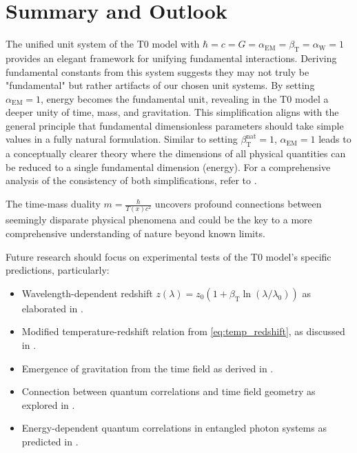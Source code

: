 \documentclass[12pt,a4paper]{article}
\newcommand{\Tfield}{T(x)}
\newcommand{\betaT}{\beta_{\text{T}}}
\newcommand{\alphaEM}{\alpha_{\text{EM}}}
\newcommand{\alphaW}{\alpha_{\text{W}}}
\begin{document}
	\section{Summary and Outlook}
	\label{sec:summary}
	
	The unified unit system of the T0 model with \(\hbar = c = G = \alphaEM = \betaT = \alphaW = 1\) provides an elegant framework for unifying fundamental interactions. Deriving fundamental constants from this system suggests they may not truly be "fundamental" but rather artifacts of our chosen unit systems. By setting \(\alphaEM = 1\), energy becomes the fundamental unit, revealing in the T0 model a deeper unity of time, mass, and gravitation. This simplification aligns with the general principle that fundamental dimensionless parameters should take simple values in a fully natural formulation. Similar to setting \(\betaT^{\text{nat}} = 1\), \(\alphaEM = 1\) leads to a conceptually clearer theory where the dimensions of all physical quantities can be reduced to a single fundamental dimension (energy). For a comprehensive analysis of the consistency of both simplifications, refer to \cite{pascher_alphabeta_2025}.
	
	The time-mass duality \(m = \frac{\hbar}{\Tfield c^2}\) uncovers profound connections between seemingly disparate physical phenomena and could be the key to a more comprehensive understanding of nature beyond known limits.
	
	Future research should focus on experimental tests of the T0 model's specific predictions, particularly:
	
	\begin{itemize}
		\item Wavelength-dependent redshift \(z(\lambda) = z_0 (1 + \betaT \ln(\lambda/\lambda_0))\) as elaborated in \cite{pascher_messdifferenzen_2025}.
		\item Modified temperature-redshift relation from \cref{eq:temp_redshift}, as discussed in \cite{pascher_temp_2025}.
		\item Emergence of gravitation from the time field as derived in \cite{pascher_emergente_gravitation_2025}.
		\item Connection between quantum correlations and time field geometry as explored in \cite{pascher_feldtheorie_2025}.
		\item Energy-dependent quantum correlations in entangled photon systems as predicted in \cite{pascher_photons_2025}.
	\end{itemize}
	
\end{document}

